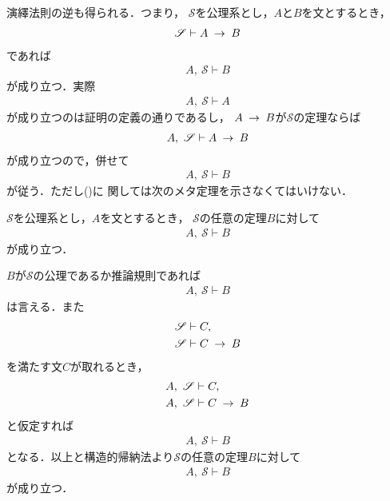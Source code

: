 	演繹法則の逆も得られる．つまり，
	$\mathscr{S}$を公理系とし，$A$と$B$を文とするとき，
	\begin{align}
		\mathscr{S} \vdash A \hspace{0.25em}\rightarrow\hspace{0.25em} B
	\end{align}
	であれば
	\begin{align}
		A,\ \mathscr{S} \vdash B
	\end{align}
	が成り立つ．実際
	\begin{align}
		A,\ \mathscr{S} \vdash A
	\end{align}
	が成り立つのは証明の定義の通りであるし，
	$A \hspace{0.25em}\rightarrow\hspace{0.25em} B$が$\mathscr{S}$の定理ならば
	\begin{align}
		A,\ \mathscr{S} \vdash A \hspace{0.25em}\rightarrow\hspace{0.25em} B
		\label{fom:inversion_of_deduction_theorem}
	\end{align}
	が成り立つので，併せて
	\begin{align}
		A,\ \mathscr{S} \vdash B
	\end{align}
	が従う．ただし()に
	関しては次のメタ定理を示さなくてはいけない．
	
	\begin{screen}
		\begin{metathm}[公理が増えても証明可能]
			$\mathscr{S}$を公理系とし，$A$を文とするとき，
			$\mathscr{S}$の任意の定理$B$に対して
			\begin{align}
				A,\ \mathscr{S} \vdash B
			\end{align}
			が成り立つ．
		\end{metathm}
	\end{screen}
	
	\begin{metaprf}
		$B$が$\mathscr{S}$の公理であるか推論規則であれば
		\begin{align}
			A,\ \mathscr{S} \vdash B
		\end{align}
		は言える．また
		\begin{align}
			\mathscr{S} &\vdash C, \\
			\mathscr{S} &\vdash C \hspace{0.25em}\rightarrow\hspace{0.25em} B
		\end{align}
		を満たす文$C$が取れるとき，
		\begin{align}
			A,\ \mathscr{S} &\vdash C, \\
			A,\ \mathscr{S} &\vdash C \hspace{0.25em}\rightarrow\hspace{0.25em} B
		\end{align}
		と仮定すれば
		\begin{align}
			A,\ \mathscr{S} \vdash B
		\end{align}
		となる．以上と構造的帰納法より$\mathscr{S}$の任意の定理$B$に対して
		\begin{align}
			A,\ \mathscr{S} \vdash B
		\end{align}
		が成り立つ．
		\QED
	\end{metaprf}
	
